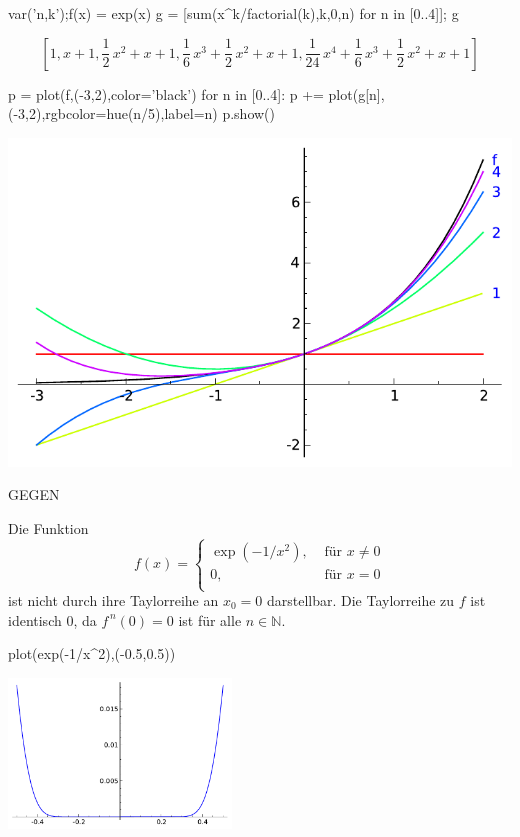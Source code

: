 \documentclass[fontsize=12pt,paper=a4,twoside,bibtotoc,idxtotoc,
liststotoc,pagesize,BCOR1.2cm,DIV15,chapterprefix,pagesize=pdftex]{scrbook}
\theoremstyle{plain}
\theoremstyle{definition}
\theoremstyle{remark}
\begin{document}
\begin{sagein}
var('n,k');f(x) = exp(x)
g = [sum(x^k/factorial(k),k,0,n) for n in [0..4]]; g
\end{sagein}
{\color{blue}\[ \left[1, x + 1, \frac{1}{2} \, x^{2} + x + 1, \frac{1}{6} \, x^{3} +
\frac{1}{2} \, x^{2} + x + 1, \frac{1}{24} \, x^{4} + \frac{1}{6} \,
x^{3} + \frac{1}{2} \, x^{2} + x + 1\right]\]}
\begin{sagein}
p = plot(f,(-3,2),color='black')
for n in [0..4]:
    p += plot(g[n],(-3,2),rgbcolor=hue(n/5),label=n)
p.show()
\end{sagein}
 \begin{center}
  \includegraphics[width=\textwidth]{taylorexp.pdf}
 \end{center}

GEGEN

Die Funktion
\[ f(x) = \left \{ \begin{array}{ll}
\exp(-1/x^2), & \mbox{ für } x \neq 0\\
0, & \mbox{ für } x = 0\\
\end{array} \right. \]
ist nicht durch ihre Taylorreihe an $x_0=0$ darstellbar. Die Taylorreihe zu $f$
ist identisch $0$, da $f^{\,n}(0)=0$ ist für alle $n \in \mathbb{N}$. \\
\begin{sagein}
plot(exp(-1/x^2),(-0.5,0.5)) 
\end{sagein}
\begin{center}
  \includegraphics[height=4cm]{taylorgegen.pdf}
 \end{center}
\end{document}

